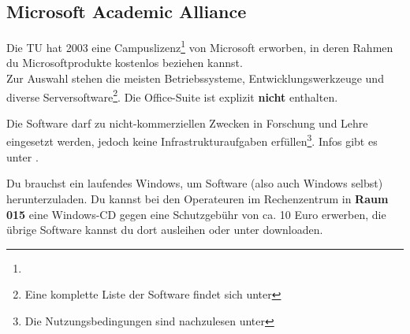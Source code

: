 \subsection{Microsoft Academic Alliance}
	\label{msdnaa}
	Die TU hat  2003 eine Campuslizenz\footnote{} von Microsoft erworben, in deren Rahmen du Microsoftprodukte kostenlos beziehen kannst.\\ 
	Zur Auswahl stehen die meisten Betriebssysteme, Entwicklungswerkzeuge und diverse Serversoftware\footnote{\sloppy Eine komplette Liste der Software findet sich unter }. Die Office-Suite ist explizit \textbf{nicht} enthalten.

	Die Software darf zu nicht-kommerziellen Zwecken in Forschung und Lehre eingesetzt werden, jedoch keine Infrastrukturaufgaben erfüllen\footnote{Die Nutzungsbedingungen sind nachzulesen unter }. Infos gibt es unter .

	Du brauchst ein laufendes Windows, um Software (also auch
	Windows selbst) herunterzuladen. Du kannst  bei den Operateuren
	im Rechenzentrum in \textbf{Raum 015} eine Windows-CD gegen eine Schutzgebühr von ca. 10 Euro erwerben, die übrige Software kannst du dort ausleihen oder unter  downloaden.
